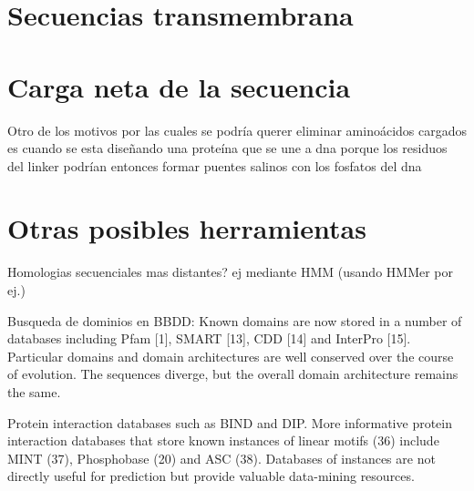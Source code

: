 \section{Secuencias transmembrana}
\cite{sonnhammer1998hidden}
\cite{krogh2001predicting}


\section{Carga neta de la secuencia}

Otro de los motivos por las cuales se podría querer eliminar aminoácidos cargados es cuando se esta diseñando una proteína que se une a dna porque los residuos del linker podrían 
entonces formar puentes salinos con los fosfatos del dna



\section{Otras posibles herramientas}
Homologias secuenciales mas distantes? ej mediante HMM (usando HMMer por ej.)

Busqueda de dominios en BBDD: Known domains are now stored in a number of databases including Pfam [1], SMART [13], CDD [14] and InterPro [15]. %
Particular domains and domain architectures are well conserved over the course of evolution. The sequences diverge, but the overall domain architecture remains the same.


Protein interaction databases such as BIND and DIP. More informative protein interaction databases that store known instances of linear motifs (36) include MINT (37), Phosphobase (20) and ASC (38). 
Databases of instances are not directly useful for prediction but provide valuable data-mining resources.